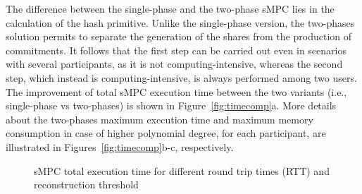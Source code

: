 The difference between the single-phase and the two-phase sMPC lies in the calculation of the hash primitive. 
Unlike the single-phase version, the two-phases solution permits to separate the generation of the shares from the production of commitments.
It follows that the first step can be carried out even in scenarios with several participants, as it is not computing-intensive, whereas the second step, which instead is computing-intensive, is always performed among two users.
The improvement of total sMPC execution time between the two variants (i.e., single-phase vs two-phases) is shown in Figure~\ref{fig:timecomp}a.
More details about the two-phases maximum execution time and maximum memory consumption in case of higher polynomial degree, for each participant, are illustrated in Figures~\ref{fig:timecomp}b-c, respectively.



\begin{figure}[t]
	\centering
	\hfill
	\hfill
	\caption{sMPC total execution time for different round trip times (RTT) and reconstruction threshold \K}
	\label{fig:timertt}
\end{figure}


